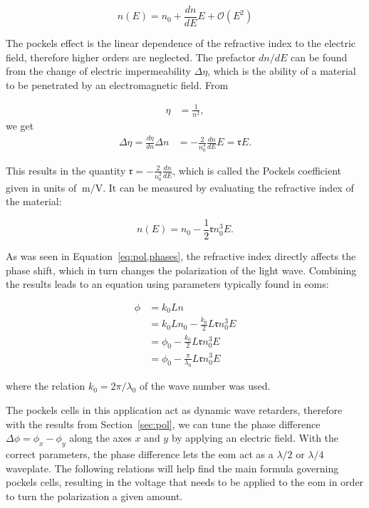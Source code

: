 \begin{equation}
	n(E) = n_0 + \frac{dn}{dE} E + \mathcal{O}(E^2)
\end{equation}

The pockels effect is the linear dependence of the refractive index to the electric field, therefore higher orders are neglected. The prefactor $dn / dE$ can be found from the change of electric impermeability $\Delta \eta$, which is the ability of a material to be penetrated by an electromagnetic field. From

\begin{align}
	\eta & = \frac{1}{n^2},
\end{align}
we get
\begin{align}
	\label{eq:pockel,refr}
	\Delta \eta = \frac{d \eta}{dn} \Delta n & = -\frac{2}{n_0^3} \frac{dn}{dE} E = \mathfrak{r} E.
\end{align}

This results in the quantity $\mathfrak{r} = -\frac{2}{n_0^3} \frac{dn}{dE}$, which is called the Pockels coefficient given in units of $\SI{}{\meter\per\volt}$. It can be measured by evaluating the refractive index of the material:

\begin{equation}
	n(E) = n_0 - \frac{1}{2} \mathfrak{r} n_0^3 E.
\end{equation}

As was seen in Equation~\ref{eq:pol,phases}, the refractive index directly affects the phase shift, which in turn changes the polarization of the light wave. Combining the results leads to an equation using parameters typically found in \acp{eom}:

\begin{align}
	\phi & = k_0 L n \\
		 & = k_0 L n_0 - \frac{k_0}{2} L \mathfrak{r} n_0^3 E \\
		 & = \phi_0 - \frac{k_0}{2} L \mathfrak{r} n_0^3 E \\
		 & = \phi_0 - \frac{\pi}{\lambda_0} L \mathfrak{r} n_0^3 E
\end{align}

where the relation $k_0 = 2 \pi / \lambda_0$ of the wave number was used.

The pockels cells in this application act as dynamic wave retarders, therefore with the results from Section~\ref{sec:pol}, we can tune the phase difference $\Delta \phi = \phi_x - \phi_y$ along the axes $x$ and $y$ by applying an electric field. With the correct parameters, the phase difference lets the \ac{eom} act as a $\lambda / 2$ or $\lambda / 4$ waveplate. The following relations will help find the main formula governing pockels cells, resulting in the voltage that needs to be applied to the \ac{eom} in order to turn the polarization a given amount.

